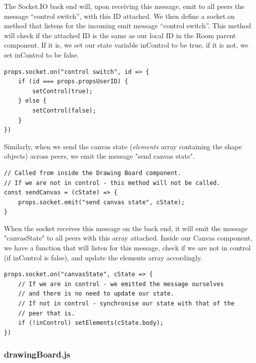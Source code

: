 The Socket.IO back end will, upon receiving this message, emit to all peers the message “control switch”, with this ID attached. We then define a socket.on method that listens for the incoming emit message “control switch”. This method will check if the attached ID is the same as our local ID in the Room parent component. If it is, we set our state variable inControl to be true, if it is not, we set inControl to be false. 

\begin{verbatim}
props.socket.on("control switch", id => {   
    if (id === props.propsUserID) {
        setControl(true);
    } else {
        setControl(false);
    }
})
\end{verbatim}

Similarly, when we send the canvas state (\textit{elements} array containing the shape objects) across peers, we emit the message "send canvas state". 

\begin{verbatim}
// Called from inside the Drawing Board component.
// If we are not in control - this method will not be called. 
const sendCanvas = (cState) => {
    props.socket.emit("send canvas state", cState);
}
\end{verbatim}

When the socket receives this message on the back end, it will emit the message "canvasState" to all peers with this array attached. Inside our Canvas component, we have a function that will listen for this message, check if we are not in control (if inControl is false), and update the elements array accordingly. 

\begin{verbatim}
props.socket.on("canvasState", cState => {
    // If we are in control - we emitted the message ourselves
    // and there is no need to update our state. 
    // If not in control - synchronise our state with that of the
    // peer that is. 
    if (!inControl) setElements(cState.body);
})
\end{verbatim}

\subsubsection{drawingBoard.js}

